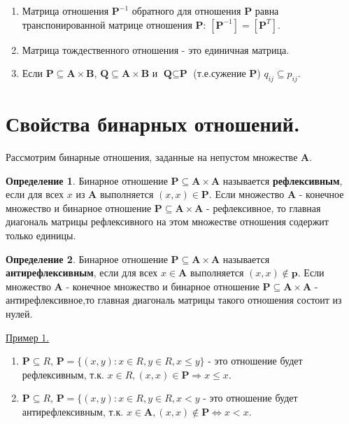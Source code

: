 \documentclass[12pt, a4paper, oneside]{article}
\theoremstyle{plain} %
\theoremstyle{definition}
\newtheorem*{definition}{Определение}  %
\newcommand{\indef}[1]{\textbf{ \color{dark_red} #1}}
\begin{document}
\begin{enumerate}
    \item Матрица отношения $\textbf{P}^{-1}$ обратного для отношения \textbf{P} равна транспонированной матрице отношения \textbf{P}: $[\textbf{P}^{-1}] = [\textbf{P}^T]$. 
    
    \item Матрица тождественного отношения - это единичная матрица.
    
    \item Если $\textbf{P} \subseteq \textbf{A} \times \textbf{B}$, $\textbf{Q} \subseteq \textbf{A} \times \textbf{B}$ и $\textbf{Q} \subseteq \textbf{P}$ \hspace{2mm}(т.е.сужение \textbf{P}) \Rightarrow $q_{ij} \subseteq p_{ij}$.
\end{enumerate}

\section{Свойства бинарных отношений.}

Рассмотрим бинарные отношения, заданные на непустом множестве \textbf{A}.

\begin{definition}
Бинарное отношение $\textbf{P} \subseteq \textbf{A} \times \textbf{A}$ называется \indef{рефлексивным}, если для всех $x$ из \textbf{A} выполняется $(x,x) \in \textbf{P}$. Если множество \textbf{A} - конечное множество и бинарное отношение $\textbf{P} \subseteq \textbf{A} \times \textbf{A}$ - рефлексивное, то главная диагональ матрицы рефлексивного на этом множестве отношения содержит только единицы. 
\end{definition}

\begin{definition}
Бинарное отношение $\textbf{P} \subseteq \textbf{A} \times \textbf{A}$ называется \indef{антирефлексивным}, если для всех $x \in \textbf{A}$ выполняется $(x,x) \notin \textbf{p}$. Если множество \textbf{A} - конечное множество и бинарное отношение $\textbf{P} \subseteq \textbf{A} \times \textbf{A}$ - антирефлексивное,то главная диагональ матрицы такого отношения состоит из нулей. 
\end{definition}


\underline{Пример 1.}
\begin{enumerate}

\item $\textbf{P} \subseteq R$, $\textbf{P} = \{(x,y): x \in R, y \in R, x \leq y\}$ - это отношение будет рефлексивным, т.к. $x \in R, (x,x) \in \textbf{P} \Rightarrow x \leq x$. 


\item $\textbf{P} \subseteq R$, $\textbf{P} = \{(x,y): x \in R, y \in R, x < y$ - это отношение будет антирефлексивным, т.к. $x \in \textbf{A}, (x,x) \notin \textbf{P} \Leftrightarrow x < x$.

\end{enumerate}
\end{document}
